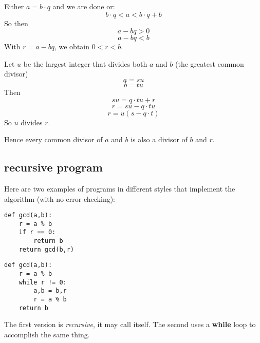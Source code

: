\documentclass[11pt, oneside]{article}
\begin{document}
Either $a = b \cdot q$ and we are done or:
\[ b \cdot q < a < b \cdot q + b \]
So then
\[ a - bq > 0 \]
\[ a - bq < b \]
With  $r = a - bq$, we obtain $0 < r < b$.

Let $u$ be the largest integer that divides both $a$ and $b$ (the greatest common divisor)
\[ a = su \]
\[ b = tu \]
Then 
\[ su = q \cdot tu + r \]
\[ r = su - q \cdot tu \]
\[ r = u(s - q \cdot t) \]
So $u$ divides $r$.

Hence every common divisor of $a$ and $b$ is also a divisor of $b$ and $r$.

\subsection*{recursive program}

Here are two examples of programs in different styles that implement the algorithm (with no error checking):

\begin{verbatim}
def gcd(a,b):
    r = a % b
    if r == 0:
        return b
    return gcd(b,r)
\end{verbatim}

\begin{verbatim}
def gcd(a,b):
    r = a % b
    while r != 0:
        a,b = b,r
        r = a % b
    return b
\end{verbatim}

The first version is \emph{recursive}, it may call itself.  The second uses a \textbf{while} loop to accomplish the same thing.
\end{document}
